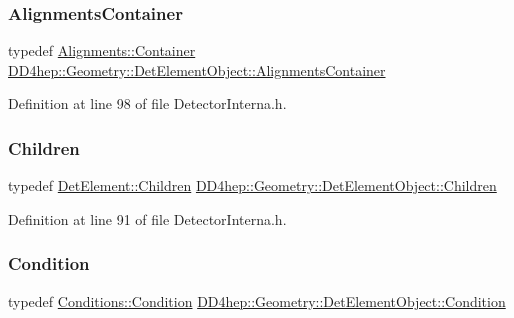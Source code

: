 \subsubsection{\texorpdfstring{Alignments\+Container}{AlignmentsContainer}}
{\footnotesize\ttfamily typedef \hyperlink{class_d_d4hep_1_1_alignments_1_1_container}{Alignments\+::\+Container} \hyperlink{class_d_d4hep_1_1_geometry_1_1_det_element_object_ab920e3c690de8d093cb556b0d3c87ce8}{D\+D4hep\+::\+Geometry\+::\+Det\+Element\+Object\+::\+Alignments\+Container}}



Definition at line 98 of file Detector\+Interna.\+h.

\hypertarget{class_d_d4hep_1_1_geometry_1_1_det_element_object_aaf04a1f51d7a7ce4c0e0dc4863268d8a}{}\label{class_d_d4hep_1_1_geometry_1_1_det_element_object_aaf04a1f51d7a7ce4c0e0dc4863268d8a} 
\subsubsection{\texorpdfstring{Children}{Children}}
{\footnotesize\ttfamily typedef \hyperlink{class_d_d4hep_1_1_geometry_1_1_det_element_afc41f63ac2a467f5077d1cca1292d580}{Det\+Element\+::\+Children} \hyperlink{class_d_d4hep_1_1_geometry_1_1_det_element_object_aaf04a1f51d7a7ce4c0e0dc4863268d8a}{D\+D4hep\+::\+Geometry\+::\+Det\+Element\+Object\+::\+Children}}



Definition at line 91 of file Detector\+Interna.\+h.

\hypertarget{class_d_d4hep_1_1_geometry_1_1_det_element_object_ad16c1a834041ed152dee870f1ec346da}{}\label{class_d_d4hep_1_1_geometry_1_1_det_element_object_ad16c1a834041ed152dee870f1ec346da} 
\subsubsection{\texorpdfstring{Condition}{Condition}}
{\footnotesize\ttfamily typedef \hyperlink{class_d_d4hep_1_1_conditions_1_1_condition}{Conditions\+::\+Condition} \hyperlink{class_d_d4hep_1_1_geometry_1_1_det_element_object_ad16c1a834041ed152dee870f1ec346da}{D\+D4hep\+::\+Geometry\+::\+Det\+Element\+Object\+::\+Condition}}




